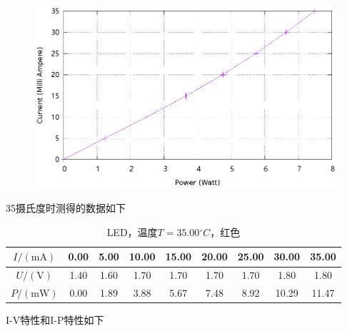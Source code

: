 \documentclass{ctexart}
\newcommand{\si}[1]{\mathrm{#1}}
\begin{document}
\begin{figure}[H]
  \centering
  \includegraphics[width=0.8\linewidth]{optics-figures/led-pc-1.gnuplot}
\end{figure}

\newpage
35摄氏度时测得的数据如下

\begin{table}[H]
  \centering
  \begin{tabular}{|c|c|c|c|c|c|c|c|c|}
    \hline
    $I/(\si{mA})$   & 0.00 & 5.00 & 10.00 & 15.00 & 20.00 & 25.00 & 30.00 & 35.00 \\\hline
    $U / (\si{V})$  & 1.40 & 1.60 & 1.70 & 1.70 & 1.70 & 1.70 & 1.80 & 1.80 \\\hline
    $P / (\si{mW})$ & 0.00 & 1.89 & 3.88 & 5.67 & 7.48 & 8.92 & 10.29 & 11.47 \\\hline
  \end{tabular}
  \caption{LED，温度$T=35.00{}^{\circ}C$，红色}
\end{table}

I-V特性和I-P特性如下
\end{document}
